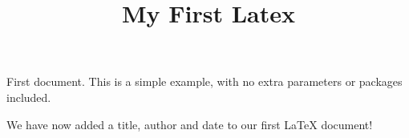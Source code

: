 \documentclass[12pt, letterpaper]{article}
\title{My First Latex}
\begin{document}
First document. This is a simple example, with no 
extra parameters or packages included.
\maketitle
We have now added a title, author and date to our first \LaTeX{} document!
\end{document}
